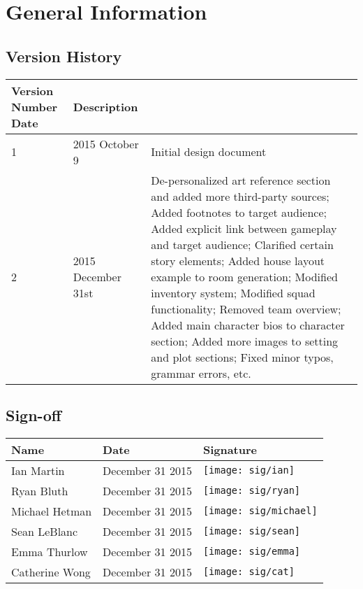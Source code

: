 \chapter{General Information}

\section{Version History}
\begin{tabular}{| p{} | p{} | p{} |}
\hline
Version Number 
Date & Description\\
\hline
1 & 2015 October 9 & Initial design document\\
\hline
2 & 2015 December 31st & De-personalized art reference section and added more third-party sources; Added footnotes to target audience; Added explicit link between gameplay and target audience; Clarified certain story elements; Added house layout example to room generation; Modified inventory system; Modified squad functionality; Removed team overview; Added main character bios to character section; Added more images to setting and plot sections; Fixed minor typos, grammar errors, etc.\\
\hline
\end{tabular}


\section{Sign-off}
\begin{tabular}{| p{} | p{} | p{} |}
  \hline
  Name & Date & Signature \\
  \hline
  Ian Martin & December 31 2015 & \texttt{[image: sig/ian]}\\
  \hline
  Ryan Bluth & December 31 2015 & \texttt{[image: sig/ryan]}\\
  \hline
  Michael Hetman & December 31 2015 & \texttt{[image: sig/michael]}\\
  \hline
  Sean LeBlanc & December 31 2015 & \texttt{[image: sig/sean]}\\
  \hline
  Emma Thurlow & December 31 2015 & \texttt{[image: sig/emma]}\\
  \hline
  Catherine Wong & December 31 2015 & \texttt{[image: sig/cat]}\\
  \hline
\end{tabular}
\setcounter{secnumdepth}{3}

\renewcommand*\contentsname{Table of Contents}

\tableofcontents
\listoffigures
